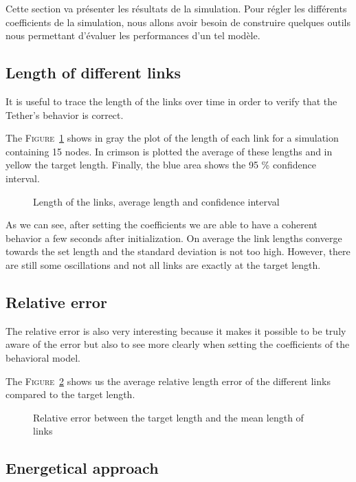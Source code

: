 Cette section va présenter les résultats de la simulation. Pour régler les différents coefficients de la simulation, nous allons avoir besoin de construire quelques outils nous permettant d'évaluer les performances d'un tel modèle.

\subsection{Length of different links}

It is useful to trace the length of the links over time in order to verify that the Tether's behavior is correct.

The \textsc{Figure}~\ref{fig:length} shows in gray the plot of the length of each link for a simulation containing 15 nodes. In crimson is plotted the average of these lengths and in yellow the target length. Finally, the blue area shows the 95 \% confidence interval.

\begin{figure}
    \centering
    
    \caption{Length of the links, average length and confidence interval}
    \label{fig:length}
\end{figure}

As we can see, after setting the coefficients we are able to have a coherent behavior a few seconds after initialization. On average the link lengths converge towards the set length and the standard deviation is not too high. However, there are still some oscillations and not all links are exactly at the target length.

\subsection{Relative error}
The relative error is also very interesting because it makes it possible to be truly aware of the error but also to see more clearly when setting the coefficients of the behavioral model.

The \textsc{Figure}~\ref{fig:error_length} shows us the average relative length error of the different links compared to the target length.

\begin{figure}
    \centering
    
    \caption{Relative error between the target length and the mean length of links}
    \label{fig:error_length}
\end{figure}

\subsection{Energetical approach}


